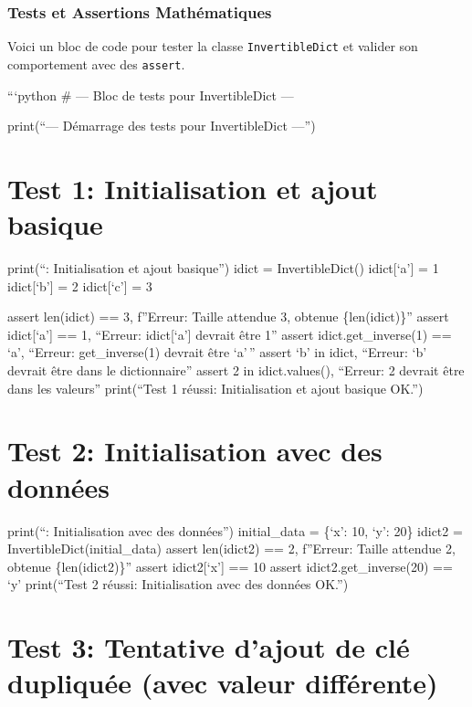 \documentclass[12pt,a4paper]{report}
\newcommand{\passthrough}[1]{#1}
\begin{document}
\subsubsection{Tests et Assertions
Mathématiques}\label{tests-et-assertions-mathuxe9matiques}

Voici un bloc de code pour tester la classe
\passthrough{\lstinline!InvertibleDict!} et valider son comportement
avec des \passthrough{\lstinline!assert!}.

```python \# --- Bloc de tests pour InvertibleDict ---

print(``--- Démarrage des tests pour InvertibleDict ---'')

\section{Test 1: Initialisation et ajout
basique}\label{test-1-initialisation-et-ajout-basique}

print(``: Initialisation et ajout basique'') idict =
InvertibleDict() idict{[}`a'{]} = 1 idict{[}`b'{]} = 2 idict{[}`c'{]} =
3

assert len(idict) == 3, f''Erreur: Taille attendue 3, obtenue
\{len(idict)\}'' assert idict{[}`a'{]} == 1, ``Erreur: idict{[}`a'{]}
devrait être 1'' assert idict.get\_inverse(1) == `a', ``Erreur:
get\_inverse(1) devrait être `a'\,'' assert `b' in idict, ``Erreur: `b'
devrait être dans le dictionnaire'' assert 2 in idict.values(),
``Erreur: 2 devrait être dans les valeurs'' print(``Test 1 réussi:
Initialisation et ajout basique OK.'')

\section{Test 2: Initialisation avec des
données}\label{test-2-initialisation-avec-des-donnuxe9es}

print(``: Initialisation avec des données'') initial\_data =
\{`x': 10, `y': 20\} idict2 = InvertibleDict(initial\_data) assert
len(idict2) == 2, f''Erreur: Taille attendue 2, obtenue
\{len(idict2)\}'' assert idict2{[}`x'{]} == 10 assert
idict2.get\_inverse(20) == `y' print(``Test 2 réussi: Initialisation
avec des données OK.'')

\section{Test 3: Tentative d'ajout de clé dupliquée (avec valeur
différente)}\label{test-3-tentative-dajout-de-cluxe9-dupliquuxe9e-avec-valeur-diffuxe9rente}
\end{document}
